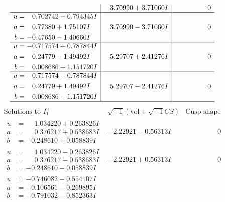 \documentclass[1p]{elsarticle_modified}
\theoremstyle{definition}
\newcommand{\I}{\sqrt{-1}}
\begin{document}
$$\begin{array}{c|c|c}
 & \phantom{-}3.70990 + 3.71060 I & \phantom{-0.000000 } 0 \\ \hline\begin{aligned}
u &= \phantom{-}0.702742 - 0.794345 I \\
a &= \phantom{-}0.77380 + 1.75107 I \\
b &= -0.47650 - 1.40660 I\end{aligned}
 & \phantom{-}3.70990 - 3.71060 I & \phantom{-0.000000 } 0 \\ \hline\begin{aligned}
u &= -0.717574 + 0.787844 I \\
a &= \phantom{-}0.24779 - 1.49492 I \\
b &= \phantom{-}0.008686 + 1.151720 I\end{aligned}
 & \phantom{-}5.29707 + 2.41276 I & \phantom{-0.000000 } 0 \\ \hline\begin{aligned}
u &= -0.717574 - 0.787844 I \\
a &= \phantom{-}0.24779 + 1.49492 I \\
b &= \phantom{-}0.008686 - 1.151720 I\end{aligned}
 & \phantom{-}5.29707 - 2.41276 I & \phantom{-0.000000 } 0\\
 \hline 
 \end{array}$$\newpage$$\begin{array}{c|c|c}  
\text{Solutions to }I^u_{1}& \I (\text{vol} + \sqrt{-1}CS) & \text{Cusp shape}\\
 \hline 
\begin{aligned}
u &= \phantom{-}1.034220 + 0.263826 I \\
a &= \phantom{-}0.376217 + 0.538683 I \\
b &= -0.248610 + 0.058839 I\end{aligned}
 & -2.22921 - 0.56313 I & \phantom{-0.000000 } 0 \\ \hline\begin{aligned}
u &= \phantom{-}1.034220 - 0.263826 I \\
a &= \phantom{-}0.376217 - 0.538683 I \\
b &= -0.248610 - 0.058839 I\end{aligned}
 & -2.22921 + 0.56313 I & \phantom{-0.000000 } 0 \\ \hline\begin{aligned}
u &= -0.746082 + 0.554107 I \\
a &= -0.106561 - 0.269895 I \\
b &= -0.791032 - 0.852363 I\end{aligned}

\end{array}$$
\end{document}
